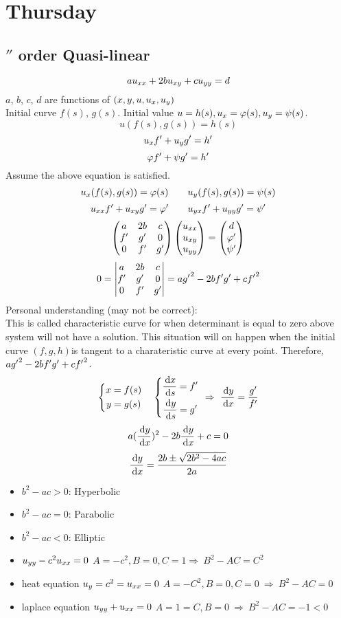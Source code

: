 \section{Thursday}
\subsection{$\second$ order Quasi-linear}
\[au_{xx}+2bu_{xy}+cu_{yy}=d
\]
$a$, $b$, $c$, $d$ are functions of $(x,y,u,u_x,u_y)$\\
Initial curve $f(s)$, $g(s)$. Initial value $u=h(s),u_x=\varphi(s), u_y=\psi(s)$.\\
\[u(f(s),g(s))=h(s)
\]
\[u_x f^{\prime}+u_y g^{\prime}=h^{\prime}
\]
\[\varphi f^{\prime}+\psi g^{\prime}=h^{\prime}
\]
Assume the above equation is satisfied.
\[u_x(f(s),g(s))=\varphi(s)\qquad u_y(f(s),g(s))=\psi(s)
\]
\[u_{xx} f^{\prime}+u_{xy} g^{\prime}=\varphi ^{\prime}\qquad u_{yx}f^{\prime}+u_{yy} g^{\prime}=\psi^{\prime}
\]
\[\begin{pmatrix}a&2b&c\\f^{\prime}&g^{\prime}&0\\0&f^{\prime}&g^{\prime}\end{pmatrix}\begin{pmatrix}u_{xx}\\u_{xy}\\u_{yy}\end{pmatrix}=\begin{pmatrix}d\\\varphi^{\prime}\\\psi^{\prime}\end{pmatrix}
\]
\[0=\begin{vmatrix}a&2b&c\\f^{\prime}&g^{\prime}&0\\0&f^{\prime}&g^{\prime}\end{vmatrix}=a{g^{\prime}}^2-2bf^{\prime} g^{\prime}+c{f^{\prime}}^2
\]
Personal understanding (may not be correct):\\
This is called characteristic curve for when determinant is equal to zero above system will not have a solution. This situation will on happen when the initial curve $(f,g,h)$is tangent to a charateristic curve at every point. Therefore, $a{g^{\prime}}^2-2bf^{\prime} g^{\prime}+c{f^{\prime}}^2$.
\[\left\{\begin{gathered}x=f(s)\\y=g(s)\end{gathered}\right.\quad\left\{\begin{gathered}\frac{\,\mathrm{d} x}{\,\mathrm{d} s}=f^{\prime}\\\frac{\,\mathrm{d} y}{\,\mathrm{d} s}=g^{\prime}\end{gathered}\right.~\Rightarrow~\frac{\,\mathrm{d} y}{\,\mathrm{d} x}=\frac{g^{\prime}}{f^{\prime}}
\]
\[a(\frac{\,\mathrm{d} y}{\,\mathrm{d} x})^2-2b\frac{\,\mathrm{d} y}{\,\mathrm{d} x}+c=0
\]
\[\frac{\,\mathrm{d} y}{\,\mathrm{d} x}=\frac{2b\pm\sqrt{2b^2-4ac}}{2a}
\]
\begin{itemize}
\item $b^2-ac>0$: Hyperbolic
\item $b^2-ac=0$: Parabolic
\item $b^2-ac<0$: Elliptic

\end{itemize}
\begin{example}

\begin{itemize}
\item $u_{yy}-c^2u_{xx}=0$ $A=-c^2, B=0, C=1\Rightarrow~B^2-AC=C^2$
\item heat equation $u_y=c^2=u_{xx}=0$  $A=-C^2, B=0, C=0~\Rightarrow~B^2-AC=0$
\item laplace equation $u_{yy}+u_{xx}=0$ $A=1=C, B=0~\Rightarrow~B^2-AC=-1<0$
\end{itemize}
\end{example}

